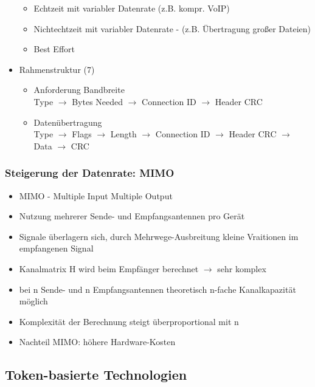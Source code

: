 \begin{itemize}
\begin{itemize}
  		\item Echtzeit mit variabler Datenrate (z.B. kompr. VoIP)
  		\item Nichtechtzeit mit variabler Datenrate - (z.B. Übertragung großer Dateien)
  		\item Best Effort	
  	\end{itemize}
  	\item Rahmenstruktur (7)
  	\begin{itemize}
  		\item Anforderung Bandbreite \\
  		Type \(\to\) Bytes Needed \(\to\) Connection ID \(\to\) Header CRC
  		\item Datenübertragung \\
  		Type \(\to\) Flags \(\to\) Length \(\to\) Connection ID \(\to\) Header CRC \(\to\) Data \(\to\) CRC
  	\end{itemize}
\end{itemize}
\subsubsection{Steigerung der Datenrate: MIMO}
\begin{itemize}
	\item MIMO - Multiple Input Multiple Output
	\item Nutzung mehrerer Sende- und Empfangsantennen pro Gerät
	\item Signale überlagern sich, durch Mehrwege-Ausbreitung kleine Vraitionen im empfangenen Signal
	\item Kanalmatrix H wird beim Empfänger berechnet \(\to\) sehr komplex
	\item bei n Sende- und n Empfangsantennen theoretisch n-fache Kanalkapazität möglich
	\item Komplexität der Berechnung steigt überproportional mit n
	\item Nachteil MIMO: höhere Hardware-Kosten
\end{itemize}
\subsection{Token-basierte Technologien}
